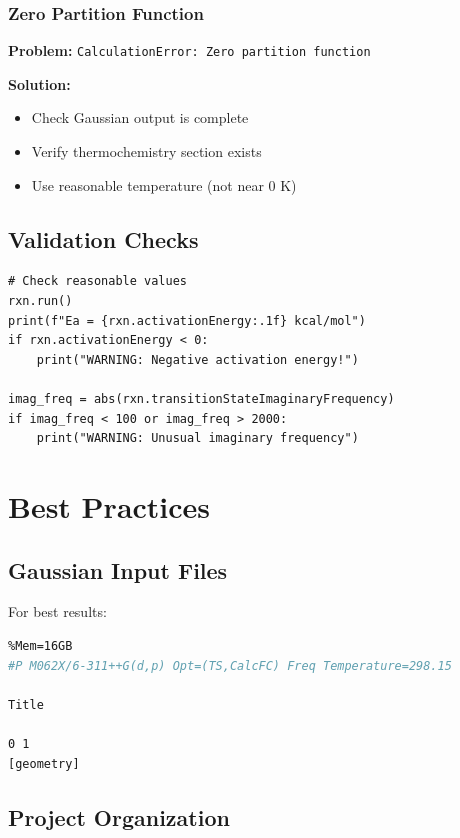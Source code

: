 \documentclass[11pt,a4paper]{book}
\begin{document}
\subsection{Zero Partition Function}
\textbf{Problem:} \texttt{CalculationError: Zero partition function}

\textbf{Solution:}
\begin{itemize}
  \item Check Gaussian output is complete
  \item Verify thermochemistry section exists
  \item Use reasonable temperature (not near 0 K)
\end{itemize}

\section{Validation Checks}

\begin{lstlisting}
# Check reasonable values
rxn.run()
print(f"Ea = {rxn.activationEnergy:.1f} kcal/mol")
if rxn.activationEnergy < 0:
    print("WARNING: Negative activation energy!")

imag_freq = abs(rxn.transitionStateImaginaryFrequency)
if imag_freq < 100 or imag_freq > 2000:
    print("WARNING: Unusual imaginary frequency")
\end{lstlisting}

\chapter{Best Practices}

\section{Gaussian Input Files}

For best results:

\begin{lstlisting}[language=bash]
%NProcShared=8
%Mem=16GB
#P M062X/6-311++G(d,p) Opt=(TS,CalcFC) Freq Temperature=298.15

Title

0 1
[geometry]

\end{lstlisting}

\section{Project Organization}
\end{document}
